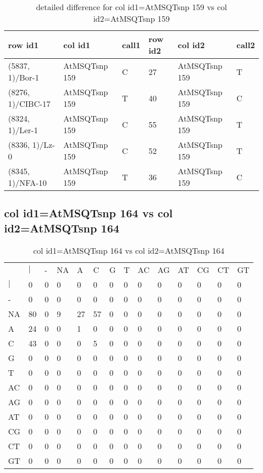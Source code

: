\begin{center}
\begin{longtable}{|l|l|l|l|l|l|}
\caption{detailed difference for col id1=AtMSQTsnp 159 vs col id2=AtMSQTsnp 159} \label{table_dm545}\\
\hline
row id1&col id1&call1&row id2&col id2&call2\\
\hline
(5837, 1)/Bor-1&AtMSQTsnp 159&C&27&AtMSQTsnp 159&T\\
(8276, 1)/CIBC-17&AtMSQTsnp 159&T&40&AtMSQTsnp 159&C\\
(8324, 1)/Ler-1&AtMSQTsnp 159&C&55&AtMSQTsnp 159&T\\
(8336, 1)/Lz-0&AtMSQTsnp 159&C&52&AtMSQTsnp 159&T\\
(8345, 1)/NFA-10&AtMSQTsnp 159&T&36&AtMSQTsnp 159&C\\
\hline
\end{longtable}
\end{center}

\subsection{col id1=AtMSQTsnp 164 vs col id2=AtMSQTsnp 164}
\begin{center}
\begin{longtable}{|l|l|l|l|l|l|l|l|l|l|l|l|l|l|}
\caption{col id1=AtMSQTsnp 164 vs col id2=AtMSQTsnp 164} \label{table_dm546}\\
\hline
\\
\hline
&$|$&-&NA&A&C&G&T&AC&AG&AT&CG&CT&GT\\
$|$&0&0&0&0&0&0&0&0&0&0&0&0&0\\
-&0&0&0&0&0&0&0&0&0&0&0&0&0\\
NA&80&0&9&27&57&0&0&0&0&0&0&0&0\\
A&24&0&0&1&0&0&0&0&0&0&0&0&0\\
C&43&0&0&0&5&0&0&0&0&0&0&0&0\\
G&0&0&0&0&0&0&0&0&0&0&0&0&0\\
T&0&0&0&0&0&0&0&0&0&0&0&0&0\\
AC&0&0&0&0&0&0&0&0&0&0&0&0&0\\
AG&0&0&0&0&0&0&0&0&0&0&0&0&0\\
AT&0&0&0&0&0&0&0&0&0&0&0&0&0\\
CG&0&0&0&0&0&0&0&0&0&0&0&0&0\\
CT&0&0&0&0&0&0&0&0&0&0&0&0&0\\
GT&0&0&0&0&0&0&0&0&0&0&0&0&0\\
\hline
\end{longtable}
\end{center}

